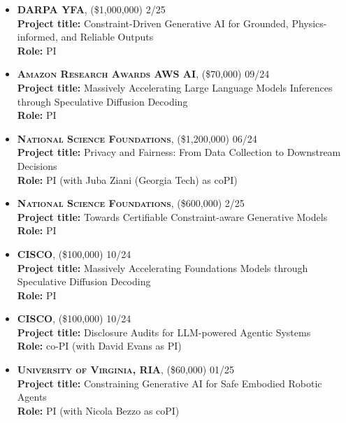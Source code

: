 



\begin{itemize}
	\item \textbf{\textsc{DARPA YFA}}, 
	(\$1,000,000)  \hfill \textsc{2/25}\\
	{\bf Project title:} {Constraint-Driven Generative AI for Grounded, Physics-informed, and Reliable Outputs}\\
	{\bf Role:} PI

	\item \textbf{\textsc{Amazon Research Awards AWS AI}}, 
	(\$70,000) \hfill \textsc{09/24}\\
	{\bf Project title:} {Massively Accelerating Large Language Models Inferences through Speculative Diffusion Decoding}\\
	{\bf Role:} PI

	\item \textbf{\textsc{National Science Foundations}}, 
	(\$1,200,000) \hfill \textsc{06/24}\\
	{\bf Project title:} {Privacy and Fairness: From Data Collection to Downstream Decisions}\\
	{\bf Role:} PI (with Juba Ziani (Georgia Tech) as coPI)

	\item \textbf{\textsc{National Science Foundations}}, 
	(\$600,000)  \hfill \textsc{2/25}\\
	{\bf Project title:} {Towards Certifiable Constraint-aware Generative Models}\\
	{\bf Role:} PI

	\item \textbf{\textsc{CISCO}}, 
	(\$100,000) \hfill \textsc{10/24}\\
	{\bf Project title:} {Massively Accelerating Foundations Models through Speculative Diffusion Decoding}\\
	{\bf Role:} PI

	\item \textbf{\textsc{CISCO}}, 
	(\$100,000) \hfill \textsc{10/24}\\
	{\bf Project title:} {Disclosure Audits for LLM-powered Agentic Systems}\\
	{\bf Role:} co-PI (with David Evans as PI)

	\item \textbf{\textsc{University of Virginia, RIA}}, 
	(\$60,000) \hfill \textsc{01/25}\\
	{\bf Project title:} {Constraining Generative AI for Safe Embodied Robotic Agents}\\
	{\bf Role:} PI (with Nicola Bezzo as coPI)


\end{itemize}
